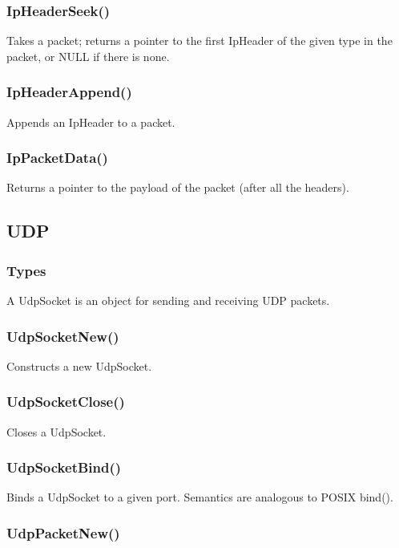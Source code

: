 \documentclass{article}
\begin{document}
\subsubsection{IpHeaderSeek()}

Takes a packet; returns a pointer to the first IpHeader of the given
type in the packet, or NULL if there is none.

\subsubsection{IpHeaderAppend()}

Appends an IpHeader to a packet.

\subsubsection{IpPacketData()}

Returns a pointer to the payload of the packet (after all the
headers).

\subsection{UDP}

\subsubsection{Types}

A UdpSocket is an object for sending and receiving UDP packets.

\subsubsection{UdpSocketNew()}

Constructs a new UdpSocket.

\subsubsection{UdpSocketClose()}

Closes a UdpSocket.

\subsubsection{UdpSocketBind()}

Binds a UdpSocket to a given port.  Semantics are analogous to POSIX
bind().

\subsubsection{UdpPacketNew()}
\end{document}
